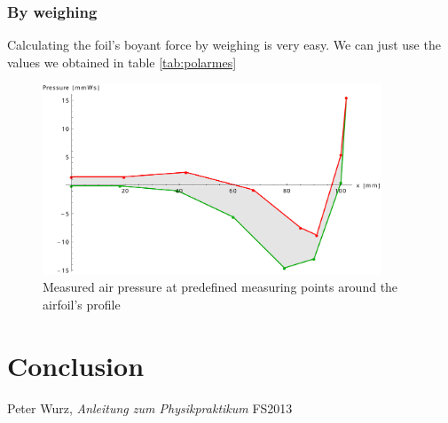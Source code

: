 \documentclass{scrreprt}
\begin{document}
\subsubsection{By weighing}
Calculating the foil's boyant force by weighing is very easy. We can just use the values we obtained in table \ref{tab:polarmes}
\begin{figure}[H]
	\centering
  \includegraphics[width=0.9\textwidth]{diag/meas_pressure.pdf}
	\caption{Measured air pressure at predefined measuring points around the airfoil's profile}
	\label{fig:pressure}
\end{figure}

\section{Conclusion}

\begin{thebibliography}{9}

  Peter Wurz,
  \emph{Anleitung zum Physikpraktikum}
  FS2013

\end{thebibliography}
\end{document}
